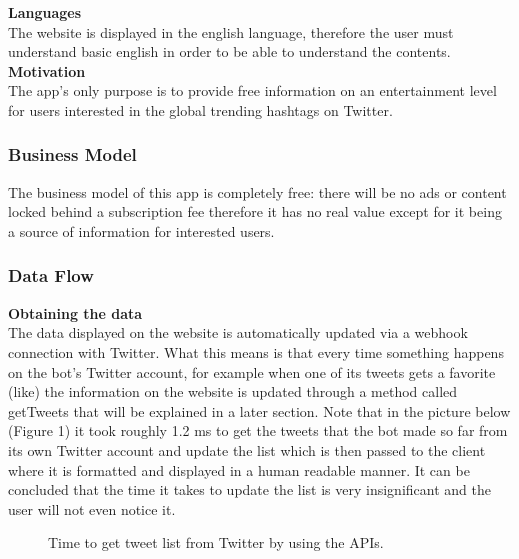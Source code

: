 \documentclass[12pt]{article} %
\begin{document}
\noindent \textbf{Languages}
\\[0.3cm]
The website is displayed in the english language, therefore the user must understand basic english
in order to be able to understand the contents.
\\[0.3cm]
\textbf{Motivation}
\\[0.3cm]
The app's only purpose is to provide free information on an entertainment level for users interested
in the global trending hashtags on Twitter.
 



\subsubsection{Business Model} %

The business model of this app is completely free: there will be no ads or content locked
behind a subscription fee therefore it has no real value except for it being a source of information for interested users.




\subsubsection{Data Flow} %

\textbf{Obtaining the data}
\\[0.3cm]
The data displayed on the website is automatically updated via a webhook connection with Twitter. What this means is that every 
time something happens on the bot's Twitter account, for example when one of its tweets gets a favorite (like)
the information on the website is updated through a method called getTweets that will be explained in a later section.
\newline
Note that in the picture below (Figure 1)  it took roughly 1.2 ms to get 
the tweets that the bot made so far from its own Twitter account and update the list which is then passed to the client where it is formatted and displayed
in a human readable manner.
It can be concluded that the time it takes to update the list is very insignificant and the user will not even notice it.

\begin{figure}[H] %
\caption{Time to get tweet list from Twitter by using the APIs.}
\label{getTweetsTime}
\end{figure}
\end{document}
